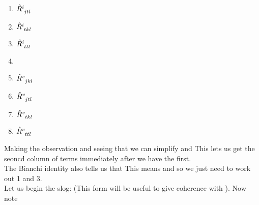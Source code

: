 \documentclass{article}
\begin{document}
\begin{multicols}{2}
\begin{enumerate}
	\centering
	\item $\hat{R}\indices{^i_j_t_l}$
	\item $\hat{R}\indices{^i_t_k_l}$
	\item $\hat{R}\indices{^i_t_t_l}$
	\item[\vspace{\fill}]
	\item $\hat{R}\indices{^v_j_k_l}$
	\item $\hat{R}\indices{^v_j_t_l}$
	\item $\hat{R}\indices{^v_t_k_l}$
	\item $\hat{R}\indices{^v_t_t_l}$
\end{enumerate}
\end{multicols}
Making the observation 
and seeing that 
we can simplify
and
This lets us get the seoncd column of terms immediately after we have the first. \\
The Bianchi identity also tells us that 
This means 
and so we just need to work out 1 and 3. \\
Let us begin the slog:
(This form  will be useful to give coherence with \cite{Duval1991}).
Now note 
\end{document}
